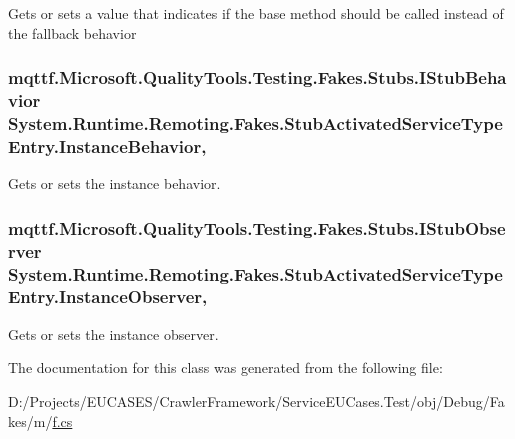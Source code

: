 Gets or sets a value that indicates if the base method should be called instead of the fallback behavior

\hypertarget{class_system_1_1_runtime_1_1_remoting_1_1_fakes_1_1_stub_activated_service_type_entry_ab44fbc738ebf22b5c34a3d08df25287a}{
\subsubsection[{Instance\-Behavior}]{\setlength{\rightskip}{0pt plus 5cm}mqttf.\-Microsoft.\-Quality\-Tools.\-Testing.\-Fakes.\-Stubs.\-I\-Stub\-Behavior System.\-Runtime.\-Remoting.\-Fakes.\-Stub\-Activated\-Service\-Type\-Entry.\-Instance\-Behavior\hspace{0.3cm}{\ttfamily [get]}, {\ttfamily [set]}}}\label{class_system_1_1_runtime_1_1_remoting_1_1_fakes_1_1_stub_activated_service_type_entry_ab44fbc738ebf22b5c34a3d08df25287a}


Gets or sets the instance behavior.

\hypertarget{class_system_1_1_runtime_1_1_remoting_1_1_fakes_1_1_stub_activated_service_type_entry_ae4ff04e5f5157bcdf58d7d18be0c408c}{
\subsubsection[{Instance\-Observer}]{\setlength{\rightskip}{0pt plus 5cm}mqttf.\-Microsoft.\-Quality\-Tools.\-Testing.\-Fakes.\-Stubs.\-I\-Stub\-Observer System.\-Runtime.\-Remoting.\-Fakes.\-Stub\-Activated\-Service\-Type\-Entry.\-Instance\-Observer\hspace{0.3cm}{\ttfamily [get]}, {\ttfamily [set]}}}\label{class_system_1_1_runtime_1_1_remoting_1_1_fakes_1_1_stub_activated_service_type_entry_ae4ff04e5f5157bcdf58d7d18be0c408c}


Gets or sets the instance observer.



The documentation for this class was generated from the following file\-:\begin{DoxyCompactItemize}
\item 
D\-:/\-Projects/\-E\-U\-C\-A\-S\-E\-S/\-Crawler\-Framework/\-Service\-E\-U\-Cases.\-Test/obj/\-Debug/\-Fakes/m/\hyperlink{m_2f_8cs}{f.\-cs}\end{DoxyCompactItemize}
